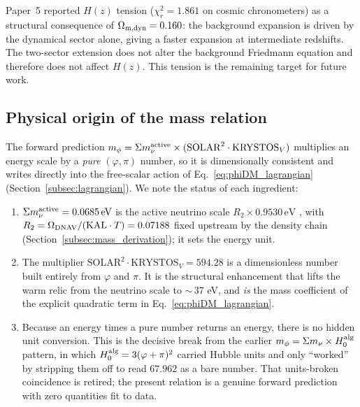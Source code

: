 \documentclass[12pt,a4paper]{article}
\newcommand{\mphi}{m_\phi}
\newcommand{\mnu}{\Sigma m_\nu}
\newcommand{\Halg}{H_0^{\rm alg}}
\newcommand{\KAL}{\mathrm{KAL}}
\begin{document}
Paper~5 reported $H(z)$ tension ($\chi^2_r = 1.861$ on cosmic chronometers) as a
structural consequence of $\Omega_{\rm m,dyn} = 0.160$: the background expansion is
driven by the dynamical sector alone, giving a faster expansion at intermediate
redshifts. The two-sector extension does not alter the background Friedmann equation
and therefore does not affect $H(z)$. This tension is the remaining target for
future work.

\subsection{Physical origin of the mass relation}
\label{subsec:origin}

The forward prediction $\mphi = \mnu^{\rm active}\times(\mathrm{SOLAR}^2\cdot\mathrm{KRYSTOS}_V)$
multiplies an energy scale by a \emph{pure} $(\varphi,\pi)$ number, so it is
dimensionally consistent and writes directly into the free-scalar action of
Eq.~\eqref{eq:phiDM_lagrangian} (Section~\ref{subsec:lagrangian}). We note the
status of each ingredient:

\begin{enumerate}
  \item $\mnu^{\rm active} = 0.0685\,\mathrm{eV}$ is the active neutrino scale
    $R_2\times0.9530\,\mathrm{eV}$ \citep{Lesgourgues2006}, with
    $R_2=\Omega_{\rm DNAV}/(\KAL\cdot T)=0.07188$ fixed upstream by the density
    chain (Section~\ref{subsec:mass_derivation}); it sets the energy unit.
  \item The multiplier $\mathrm{SOLAR}^2\cdot\mathrm{KRYSTOS}_V = 594.28$ is a
    dimensionless number built entirely from $\varphi$ and $\pi$. It is the
    structural enhancement that lifts the warm relic from the neutrino scale to
    $\sim$\,37 eV, and \emph{is} the mass coefficient of the explicit quadratic
    term in Eq.~\eqref{eq:phiDM_lagrangian}.
  \item Because an energy times a pure number returns an energy, there is no
    hidden unit conversion. This is the decisive break from the earlier
    $\mphi=\mnu\times\Halg$ pattern, in which $\Halg=3(\varphi+\pi)^2$ carried
    Hubble units and only ``worked'' by stripping them off to read $67.962$ as a
    bare number. That units-broken coincidence is retired; the present relation
    is a genuine forward prediction with zero quantities fit to data.
\end{enumerate}
\end{document}
